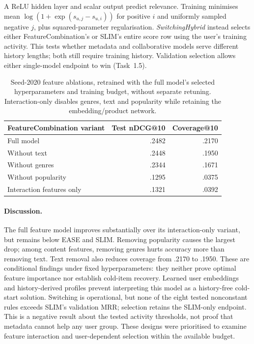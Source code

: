 \documentclass[12pt,a4paper]{article}   %
\begin{document}
A ReLU hidden layer and scalar output predict relevance. Training minimises mean $\log(1+\exp(s_{u,j}-s_{u,i}))$ for positive $i$ and uniformly sampled negative $j$, plus squared-parameter regularisation. \emph{SwitchingHybrid} instead selects either FeatureCombination's or SLIM's entire score row using the user's training activity. This tests whether metadata and collaborative models serve different history lengths; both still require training history. Validation selection allows either single-model endpoint to win (Task~1.5).

\begin{table}[H]
\centering
\begin{tabular}{lrr}
\toprule
FeatureCombination variant & Test nDCG@10 & Coverage@10 \\
\midrule
Full model & .2482 & .2170 \\
Without text & .2448 & .1950 \\
Without genres & .2344 & .1671 \\
Without popularity & .1295 & .0375 \\
Interaction features only & .1321 & .0392 \\
\bottomrule
\end{tabular}
\caption{Seed-2020 feature ablations, retrained with the full model's selected hyperparameters and training budget, without separate retuning. Interaction-only disables genres, text and popularity while retaining the embedding/product network.}
\label{tab:fc}
\end{table}

\paragraph{Discussion.}
The full feature model improves substantially over its interaction-only variant, but remains below EASE and SLIM. Removing popularity causes the largest drop; among content features, removing genres hurts accuracy more than removing text. Text removal also reduces coverage from .2170 to .1950. These are conditional findings under fixed hyperparameters: they neither prove optimal feature importance nor establish cold-item recovery. Learned user embeddings and history-derived profiles prevent interpreting this model as a history-free cold-start solution. Switching is operational, but none of the eight tested nonconstant rules exceeds SLIM's validation MRR; selection retains the SLIM-only endpoint. This is a negative result about the tested activity thresholds, not proof that metadata cannot help any user group. These designs were prioritised to examine feature interaction and user-dependent selection within the available budget.
\end{document}
